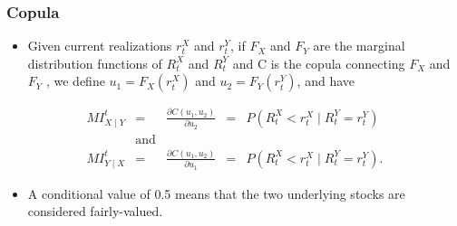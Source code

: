 \documentclass[pdf,9pt,xcolor=dvipsnames,hide notes]{beamer}
\begin{document}
\begin{frame}[label=frame4f]
	\frametitle{Copula}
	
		\vspace{0.3cm}
	
		\begin{itemize}
			\item 	Given current realizations $r_{t}^{X}$ and $r_{t}^{Y}$, if $F_{X}$ and $F_{Y} $ are the marginal distribution functions of $R_{t}^{X}$ and $R_{t}^{Y} $ and C is the copula connecting $F_{X}$ and $F_{Y}$ , we define $u_{1}=F_{X}\left( r_{t}^{X}\right) $ and $u_{2}=F_{Y}\left( r_{t}^{Y}\right) $, and have
		\end{itemize}
				
		\begin{equation}
		\begin{aligned}
		MI_{X\mid Y}^{t}& = &\frac{\partial C(u_{1},u_{2})}{\partial u_{2}} & = & P(R_{t}^{X}<r_{t}^{X}\mid R_{t}^{Y}=r_{t}^{Y}) \\
		& \text{and} & \\
		MI_{Y\mid X}^{t}& = &\frac{\partial C(u_{1},u_{2})}{\partial u_{1}}& = & P(R_{t}^{X}<r_{t}^{X}\mid R_{t}^{Y}=r_{t}^{Y}).
		\end{aligned}
		\label{eq:eq31}
		\end{equation}
		
		\vspace{0.3cm}
		
			\begin{itemize}
			\justifying
			\item A conditional value of 0.5 means that
			the two underlying stocks are considered fairly-valued.
			\end{itemize}
\end{frame}
\end{document}
